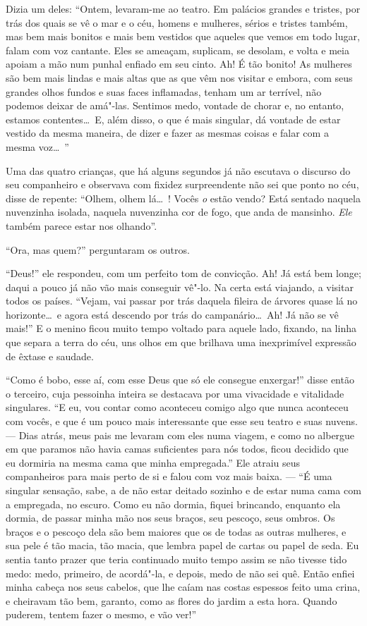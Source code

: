 Dizia um deles: “Ontem, levaram-me ao teatro. Em palácios
grandes e tristes, por trás dos quais se vê o mar e o céu, homens e
mulheres, sérios e tristes também, mas bem mais bonitos e mais bem 
vestidos que aqueles que vemos em todo lugar, falam com voz
cantante. Eles se ameaçam, suplicam, se desolam, e volta e meia apoiam
a mão num punhal enfiado em seu cinto. Ah! É tão bonito!
As mulheres são bem mais lindas e mais altas que as que
vêm nos visitar e embora, com seus grandes olhos fundos e suas faces
inflamadas, tenham um ar terrível, não podemos deixar de amá"-las.
Sentimos medo, vontade de chorar e, no entanto, estamos contentes\ldots\  E,
além disso, o que é mais singular, dá vontade de estar vestido da mesma
maneira, de dizer e fazer as mesmas coisas e falar com a mesma
voz\ldots\ ”

Uma das quatro crianças, que há alguns segundos já não escutava o
discurso do seu companheiro e observava com fixidez surpreendente não
sei que ponto no céu, disse de repente: “Olhem, olhem
lá\ldots\ ! Vocês \textit{o} estão vendo? Está sentado naquela nuvenzinha isolada,
naquela nuvenzinha cor de fogo, que anda de mansinho. \textit{Ele} também
parece estar nos olhando''.



“Ora, mas quem?'' perguntaram os outros.

“Deus!'' ele respondeu, com um perfeito tom de
convicção. Ah! Já está bem longe; daqui a pouco
já não vão mais conseguir vê"-lo. Na certa está viajando, a
visitar todos os países. “Vejam, vai passar por trás daquela fileira
de árvores quase lá no horizonte\ldots\  e agora está descendo por
trás do campanário\ldots\  Ah! Já não se vê mais!'' E
o menino ficou muito tempo voltado para aquele lado, fixando, na linha
que separa a terra do céu, uns olhos em que brilhava uma inexprimível
expressão de êxtase e saudade.

“Como é bobo, esse aí, com esse Deus que só ele consegue
enxergar!'' disse então o terceiro, cuja pessoinha inteira
se destacava por uma vivacidade e vitalidade singulares.
“E eu, vou contar como aconteceu comigo algo que
nunca aconteceu com vocês, e que é um pouco mais interessante que esse seu
teatro e suas nuvens. --- Dias atrás, meus pais me levaram com
eles numa viagem, e como no albergue em que paramos não havia camas
suficientes para nós todos, ficou decidido que eu dormiria na mesma
cama que minha empregada.” Ele atraiu seus companheiros
para mais perto de si e falou com voz mais baixa. --- “É
uma singular sensação, sabe, a de não estar deitado sozinho e de estar
numa cama com a empregada, no escuro. Como eu não dormia, fiquei
brincando, enquanto ela dormia, de passar minha mão nos seus braços, 
seu pescoço, seus ombros. Os braços e o pescoço dela são bem
maiores que os de todas as outras mulheres, e sua pele é tão macia, tão
macia, que lembra papel de cartas ou papel de seda. Eu sentia tanto
prazer que teria continuado muito tempo assim se não tivesse tido
medo: medo, primeiro, de acordá"-la, e depois, medo de não sei quê.
Então enfiei minha cabeça nos seus cabelos, que lhe caíam nas costas
espessos feito uma crina, e cheiravam tão bem, garanto, como as
flores do jardim a esta hora. Quando puderem, tentem fazer o mesmo, e vão ver!''


